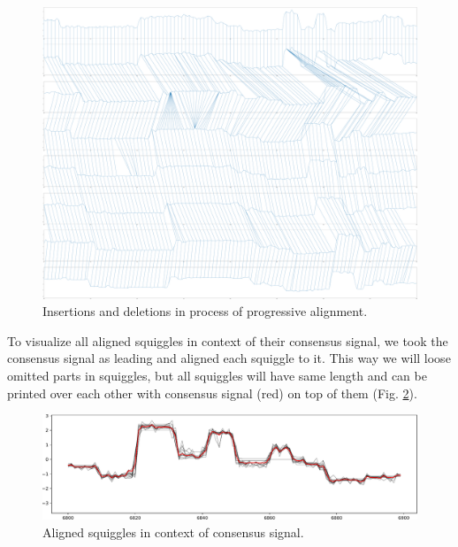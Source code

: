 \begin{figure}[h]
  \centering
  \includegraphics[width=1.0\textwidth]{images/pairings}
  \caption{Insertions and deletions in process of progressive alignment.}
  \label{fig:pairings}
\end{figure}

To visualize all aligned squiggles in context of their consensus signal, we took the consensus signal as leading and aligned each squiggle to it.
This way we will loose omitted parts in squiggles, but all squiggles will have same length and can be printed over each other with consensus signal (red) on top of them (Fig. \ref{fig:foos}).

\begin{figure}[h]
  \centering
  \includegraphics[width=1.0\textwidth]{images/foos}
  \caption{Aligned squiggles in context of consensus signal.}
  \label{fig:foos}
\end{figure}